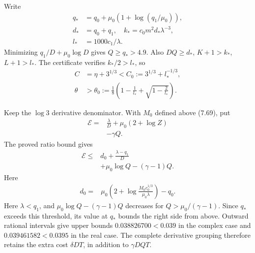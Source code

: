 \documentclass[
  11pt,
  a4paper,
]{article}
\begin{document}
Write \[
\begin{aligned}
q_*&=q_0+\mu_0(1+\log(q_1/\mu_0)),\\
d_*&=q_0+q_1,\quad k_*=c_0m^2d_*\lambda^{-3},\\
l_*&=1000c_1/\lambda.
\end{aligned}
\] Minimizing \(q_1/D+\mu_0\log D\) gives \(Q\ge q_*>4.9\). Also
\(DQ\ge d_*\), \(K+1>k_*\), \(L+1>l_*\). The certificate verifies
\(k_*/2>l_*\), so \[
\begin{aligned}
C&=\eta+3^{1/3}<C_0:=3^{1/3}+l_*^{-1/3},\\
\theta&>\theta_0:=\frac18
\left(1-\frac1{l_*}+\sqrt{1-\frac2{l_*}}\right).
\end{aligned}
\]

Keep the \(\log3\) derivative denominator. With \(M_0\) defined above
(7.69), put \[
\begin{aligned}
\mathcal E={}&\frac\lambda D+\mu_0(2+\log Z)\\
&-\gamma Q.
\end{aligned}
\] The proved ratio bound gives \[
\begin{aligned}
\mathcal E\le{}&d_0+\frac{\lambda-q_1}{D}\\
&+\mu_0\log Q-(\gamma-1)Q.
\end{aligned}
\] Here \[
\begin{aligned}
d_0={}&\mu_0\left(2+\log
\frac{M_0c_0^{1/3}}{\mu_0\lambda}\right)-q_0.
\end{aligned}
\] Here \(\lambda<q_1\), and \(\mu_0\log Q-(\gamma-1)Q\) decreases for
\(Q>\mu_0/(\gamma-1)\). Since \(q_*\) exceeds this threshold, its value
at \(q_*\) bounds the right side from above. Outward rational intervals
give upper bounds \(0.038826700<0.039\) in the complex case and
\(0.039461582<0.0395\) in the real case. The complete derivative
grouping therefore retains the extra cost \(\delta DT\), in addition to
\(\gamma DQT\).
\end{document}
